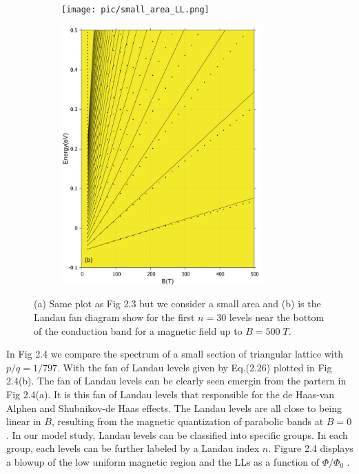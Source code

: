 \documentclass{report}
\begin{document}
\begin{figure}[htb]
	\centering
	\begin{subfigure}[b]{0.49\textwidth}
		\centering
		{\texttt{[image: pic/small\_area\_LL.png]}}
	\end{subfigure}
	\begin{subfigure}[b]{0.49\textwidth}
		\centering
		\includegraphics[width=0.85\textwidth,height=1.2\linewidth]{pic/landaulevel_h0_q_797_final.pdf}
	\end{subfigure}
	\caption{
		(a) Same plot as Fig 2.3 but we consider a small area and (b) is the Landau fan diagram show for the first $n = 30$ levels near the bottom of the conduction band for a magnetic field up to $B = 500\; T$.
	}
\end{figure}

In Fig 2.4 we compare the spectrum of a small section of triangular lattice with $p / q = 1 / 797$. With the fan of Landau levels given by Eq.(2.26) plotted in Fig 2.4(b). The fan of Landau levels can be clearly seen emergin from the partern in Fig 2.4(a). It is this fan of Landau levels that responsible for the de Haas-van Alphen and Shubnikov-de Haas effects. \cite{Shoenberg_1984,singleton2001band,blundell2001magnetism,kittel1987quantum} The Landau levels are all close to being linear in $B$, resulting from the magnetic quantization of parabolic bands at $B = 0$. In our model study, Landau levels can be classified into specific groups. In each group, each levels can be further labeled by a Landau index $n$. Figure 2.4 displays a blowup of the low uniform magnetic region and the LLs as a function of $\Phi / \Phi_{0}$ \cite{Li_2011}.
\end{document}
